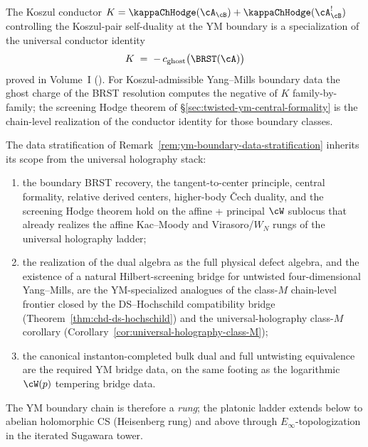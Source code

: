 \begin{remark}
\label{rem:ym-universal-conductor}
The Koszul conductor $K = \kappaChHodge(\cA_{\cB}) + \kappaChHodge(\cA_{\cB}^!)$ controlling the
Koszul-pair self-duality at the YM boundary is a specialization of the
universal conductor identity
\[
K \;=\; -\,c_{\mathrm{ghost}}\bigl(\BRST(\cA)\bigr)
\]
proved in Volume~I (). For
Koszul-admissible Yang--Mills boundary data the
ghost charge of the BRST resolution computes the negative of $K$ family-by-family;
the screening Hodge theorem of \S\ref{sec:twisted-ym-central-formality} is the
chain-level realization of the conductor identity for those boundary classes.
\end{remark}

\begin{remark}
\label{rem:ym-universal-scope-stratification}
The data stratification of Remark~\ref{rem:ym-boundary-data-stratification}
inherits its scope from the universal holography stack:
\begin{enumerate}[label=(\alph*)]
\item the boundary BRST recovery, the tangent-to-center principle, central
formality, relative derived centers, higher-body \v{C}ech duality, and the
screening Hodge theorem hold on the affine + principal $\cW$
sublocus that already realizes the affine Kac--Moody and Virasoro/$W_N$ rungs
of the universal holography ladder;
\item the realization of the dual algebra as the full physical defect algebra,
and the existence of a natural Hilbert-screening bridge for untwisted
four-dimensional Yang--Mills, are the YM-specialized analogues of the
class-$M$ chain-level frontier closed by the DS--Hochschild compatibility bridge
(Theorem~\ref{thm:chd-ds-hochschild}) and the universal-holography class-$M$
corollary (Corollary~\ref{cor:universal-holography-class-M});
\item the canonical instanton-completed bulk dual and full untwisting equivalence
are the required YM bridge data, on the same footing as the logarithmic
$\cW(p)$ tempering bridge data.
\end{enumerate}
The YM boundary chain is therefore a \emph{rung}; the platonic ladder
extends below to abelian holomorphic CS (Heisenberg rung) and above through
$E_\infty$-topologization in the iterated Sugawara tower.
\end{remark}
